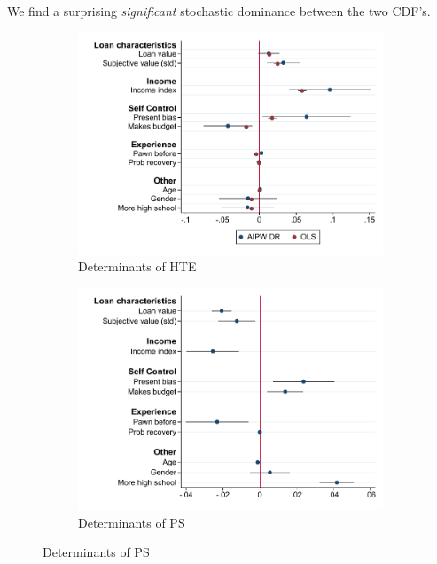 \documentclass[oneside,11pt]{article}
\begin{document}
We find a surprising \emph{significant} stochastic dominance between the two CDF's.

\begin{figure}[H]
    \caption{}
    \label{}
    \begin{center}
    \begin{subfigure}{0.475\textwidth}
        \caption{Determinants of HTE}
        \centering
        \includegraphics[width=\textwidth]{Figuras/HE/he_int_vertical_eff_cost_loan_pro_2.pdf}
    \end{subfigure}
    \begin{subfigure}{0.475\textwidth}
        \caption{Determinants of PS}
        \centering
        \includegraphics[width=\textwidth]{Figuras/HE/ps_int_vertical_pr_gbc_1.pdf}
    \end{subfigure}
  

\end{center}
\end{figure}
\end{document}
